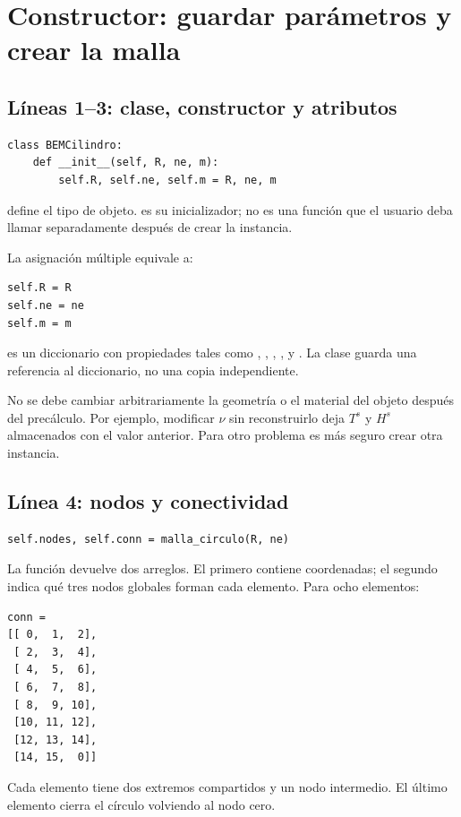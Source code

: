 \documentclass[11pt,a4paper]{article}
\numberwithin{equation}{section}
\DeclareRobustCommand{\code}[1]{\texttt{\detokenize{#1}}}
\begin{document}
\section{Constructor: guardar par\'ametros y crear la malla}
\label{sec:inicio}
\subsection{L\'ineas 1--3: clase, constructor y atributos}
\begin{lstlisting}
class BEMCilindro:
    def __init__(self, R, ne, m):
        self.R, self.ne, self.m = R, ne, m
\end{lstlisting}
\code{class} define el tipo de objeto. \code{__init__} es su
inicializador; no es una funci\'on que el usuario deba llamar
separadamente despu\'es de crear la instancia.

La asignaci\'on m\'ultiple equivale a:
\begin{lstlisting}
self.R = R
self.ne = ne
self.m = m
\end{lstlisting}
\code{m} es un diccionario con propiedades tales como
\code{m["nu"]}, \code{m["mu"]}, \code{m["lam"]},
\code{m["rho"]}, \code{m["cs"]} y \code{m["cp"]}.
La clase guarda una referencia al diccionario, no una copia independiente.

\begin{cuidado}
No se debe cambiar arbitrariamente la geometr\'ia o el material del
objeto despu\'es del prec\'alculo. Por ejemplo, modificar $\nu$
sin reconstruirlo deja $T^s$ y $H^s$ almacenados con el valor anterior.
Para otro problema es m\'as seguro crear otra instancia.
\end{cuidado}

\subsection{L\'inea 4: nodos y conectividad}
\begin{lstlisting}
self.nodes, self.conn = malla_circulo(R, ne)
\end{lstlisting}
La funci\'on devuelve dos arreglos. El primero contiene coordenadas;
el segundo indica qu\'e tres nodos globales forman cada elemento.
Para ocho elementos:
\begin{lstlisting}[language={}]
conn =
[[ 0,  1,  2],
 [ 2,  3,  4],
 [ 4,  5,  6],
 [ 6,  7,  8],
 [ 8,  9, 10],
 [10, 11, 12],
 [12, 13, 14],
 [14, 15,  0]]
\end{lstlisting}
Cada elemento tiene dos extremos compartidos y un nodo intermedio.
El \'ultimo elemento cierra el c\'irculo volviendo al nodo cero.
\end{document}
